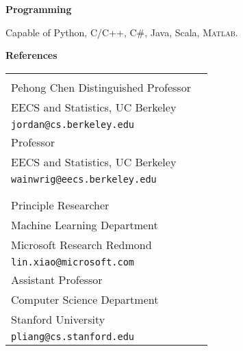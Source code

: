 \documentclass{res} %
\begin{document}
\begin{resume}
{\Large\bf Programming}

\vspace{-5pt}
Capable of Python, C/C++, C\#, Java, Scala, \textsc{Matlab}.

{\Large\bf References}

\begin{tabular}{ll}
\begin{minipage}{0.5\textwidth}
{\bf Michael I. Jordan}\\
Pehong Chen Distinguished Professor\\
EECS and Statistics, UC Berkeley\\
{\tt jordan@cs.berkeley.edu}
\end{minipage}&
\begin{minipage}{0.5\textwidth}
{\bf Martin J. Wainwright}\\
Professor\\
EECS and Statistics, UC Berkeley\\
{\tt wainwrig@eecs.berkeley.edu}
\end{minipage}\\\\
\begin{minipage}{0.5\textwidth}
{\bf Lin Xiao}\\
Principle Researcher\\
Machine Learning Department\\
Microsoft Research Redmond\\
{\tt lin.xiao@microsoft.com}
\end{minipage}&
\begin{minipage}{0.5\textwidth}
{\bf Percy Liang}\\
Assistant Professor\\
Computer Science Department\\
Stanford University\\
{\tt pliang@cs.stanford.edu}
\end{minipage}
\end{tabular}

\end{resume}
\end{document}
